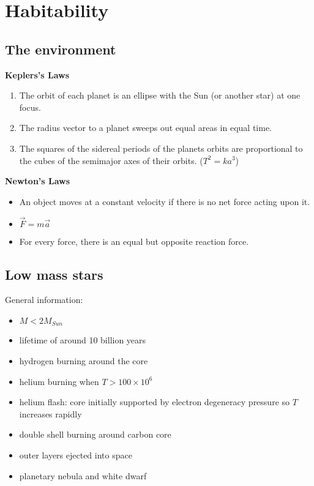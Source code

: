 \documentclass{article}
\theoremstyle{sltheorem}
\begin{document}
\section{Habitability}
\subsection{The environment}
\textbf{Keplers's Laws}
\begin{enumerate}
    \item The orbit of each planet is an ellipse with the Sun (or another star) at one focus.
    \item The radius vector to a planet sweeps out equal areas in equal time.
    \item The squares of the sidereal periods of the planets orbits are proportional to the cubes of the semimajor axes of their orbits. ($T^2=ka^3$)
\end{enumerate}
\textbf{Newton's Laws}
\begin{itemize}
    \item An object moves at a constant velocity if there is no net force acting upon it.
    \item $\vec F = m \vec a$
    \item For every force, there is an equal but opposite reaction force.
\end{itemize}
\subsection{Low mass stars}
General information:
\begin{itemize}
    \item $M < 2M_{Sun}$
    \item lifetime of around 10 billion years
    \item hydrogen burning around the core
    \item helium burning when $T > 100 \times 10^6$
    \item helium flash: core initially supported by electron degeneracy pressure so $T$ increases rapidly
    \item double shell burning around carbon core
    \item outer layers ejected into space
    \item planetary nebula and white dwarf
\end{itemize}
\end{document}
